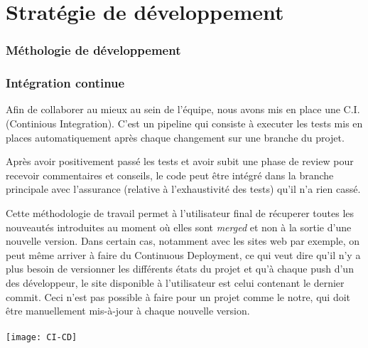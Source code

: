 \part{Stratégie de développement}
\section{Méthologie de développement}

\section{Intégration continue}
Afin de collaborer au mieux au sein de l'équipe, nous avons mis en place
une C.I. (Continious Integration). C'est un pipeline qui consiste à executer
les tests mis en places automatiquement après chaque changement sur une branche
du projet.

Après avoir positivement passé les tests et avoir subit une phase de review
pour recevoir commentaires et conseils, le code peut être intégré dans la
branche principale avec l'assurance (relative à l’exhaustivité des tests) qu'il
n'a rien cassé.

Cette méthodologie de travail permet à l’utilisateur final de récuperer toutes
les nouveautés introduites au moment où elles sont \emph{merged} et non à la
sortie d’une nouvelle version. Dans certain cas, notamment avec les sites web
par exemple, on peut même arriver à faire du Continuous Deployment, ce qui veut
dire qu’il n’y a plus besoin de versionner les différents états du projet et
qu’à chaque push d’un des développeur, le site disponible à l’utilisateur est
celui contenant le dernier commit. Ceci n'est pas possible à faire pour un
projet comme le notre, qui doit être manuellement mis-à-jour à chaque nouvelle
version.
\\
\\
\texttt{[image: CI-CD]}
